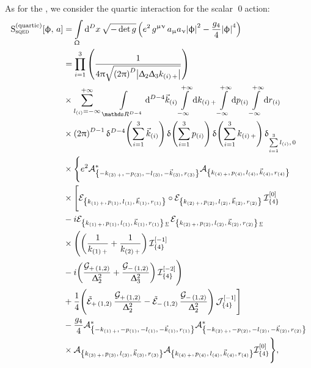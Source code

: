 As for the \nbo, we consider the quartic interaction for the scalar \qed action:
\begin{equation}
  \begin{split}
    \rS_{\text{s}\qed}^{(\text{quartic})}\qty[ \phi,\, a ]
    & =
    \int\limits_{\Omega} \dd[D]{x} \sqrt{-\det g}\,
    \qty(%
      e^2\, g^{\mu\nu}\, a_{\mu} a_{\nu} \abs{\phi}^2
      -
      \frac{g_4}{4} \abs{\phi}^4
    )
    \\
    & =
    \finiteprod{i}{1}{3}
    \qty(%
      \frac{1}{4\pi \sqrt{\qty(2\pi)^D \abs{\Delta_2\Delta_3 k_{\qty(i)\, +}}}}
    )
    \\
    & \times
    \infinfsum{l_{(i)}}\,
    \int\limits_{\R^{D-4}} \dd[D-4]{\vec{k}_{\qty(i)}}
    \infinfint{k_{\qty(i)\, +}}
    \infinfint{p_{(i)}}
    \infinfint{r_{(i)}}
    \\
    & \times
    \qty( 2 \pi )^{D-1}\,
    \delta^{D-4}\qty( \finitesum{i}{1}{3} \vec{k}_{\qty(i)} )\,
    \delta\qty( \finitesum{i}{1}{3} p_{(i)} )\,
    \delta\qty( \finitesum{i}{1}{3} k_{\qty(i)\, +} )\,
    \delta_{\finitesum{i}{1}{3} l_{(i)},\, 0}
    \\
    & \times
    \Biggl\lbrace
      e^2
      \cA^*_{\mkmkrgenN{3}}
      \cA_{\kmkrgenN{4}}
      \\
      & \times
      \Biggl[
        \cE_{\kmkrgenN{1}} \circ \cE_{\kmkrgenN{2}}\,
        \cI_{\qty{4}}^{\qty[0]}
        \\
        & - i
        \cE_{\kmkrgenN{1}\, \underv}\,
        \cE_{\kmkrgenN{2}\, \underv}
        \\
        & \times
        \Biggl(
          \qty( \frac{1}{k_{\qty(1)\, +}} + \frac{1}{k_{\qty(2)\, +}} )\,
          \cI_{\qty{4}}^{\qty[-1]}
          \\
          & - i
          \qty(
              \frac{\cG_{+\,(1,2)}}{\Delta_2^2}
              +
              \frac{\cG_{-\,(1,2)}}{\Delta_3^2}
          )\,
          \cI_{\qty{4}}^{\qty[-2]}
        \Biggr)
        \\
        & +
        \frac{1}{4}
        \Biggl(
          \tilde{\cE}_{+\,(1,2)}\,
          \frac{\cG_{+\,(1,2)}}{\Delta_2^2}
          -
          \tilde{\cE}_{-\,(1,2)}\,
          \frac{\cG_{-\,(1,2)}}{\Delta_2^2}
        \Biggr)\,
        \cJ_{\qty{4}}^{\qty[-1]}
      \Biggr]
      \\
      & -
      \frac{g_4}{4}
      \cA^*_{\mkmkrgenN{1}}
      \cA^*_{\mkmkrgenN{2}}
      \\
      & \times
      \cA_{\kmkrgenN{3}}
      \cA_{\kmkrgenN{4}}
      \cI_{\qty{4}}^{\qty[0]}
    \Biggr\rbrace,
  \end{split}
\end{equation}

